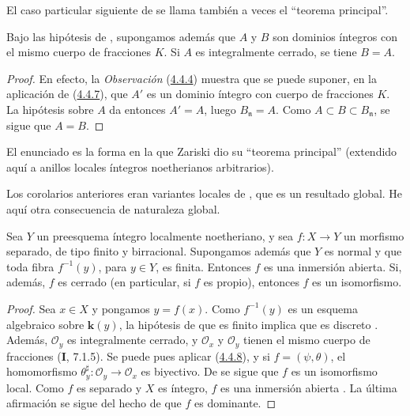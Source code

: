 El caso particular siguiente de  se llama también a
veces el ``teorema principal''.

\begin{corollary}[4.4.8]
\label{III.4.4.8}
\label{III.4.4.8-fr}
Bajo las hipótesis de , supongamos además que $A$ y
$B$ son dominios íntegros con el mismo cuerpo de fracciones $K$.
Si $A$ es
integralmente cerrado, se tiene $B=A$.
\end{corollary}

\begin{proof}
En efecto, la \emph{Observación} (\hyperref[III.4.4.4-fr]{4.4.4}) muestra que se puede
suponer, en la aplicación de (\hyperref[III.4.4.7-fr]{4.4.7}), que $A'$ es un dominio íntegro con
cuerpo de fracciones $K$. La hipótesis sobre $A$ da entonces
$A'=A$, luego $B_{\mathfrak n}=A$. Como
$A\subset B\subset B_{\mathfrak n}$, se sigue que $A=B$.
\end{proof}

El enunciado  es la forma en la que Zariski dio su
``teorema principal'' (extendido aquí a anillos locales íntegros
noetherianos arbitrarios).

Los corolarios anteriores eran variantes locales de
, que es un resultado global. He aquí otra
consecuencia de naturaleza global.

\begin{corollary}[4.4.9]
\label{III.4.4.9}
\label{III.4.4.9-fr}
Sea $Y$ un preesquema íntegro localmente noetheriano, y sea
$f:X\to Y$ un morfismo separado, de tipo finito y birracional.
Supongamos además que $Y$ es normal y que toda fibra $f^{-1}(y)$,
para $y\in Y$, es finita. Entonces $f$ es una inmersión abierta. Si,
además, $f$ es cerrado (en particular, si $f$ es propio), entonces
$f$ es un isomorfismo.
\end{corollary}

\begin{proof}
Sea $x\in X$ y pongamos $y=f(x)$. Como $f^{-1}(y)$ es un esquema
algebraico sobre $\boldsymbol{k}(y)$, la hipótesis de que es finito implica que
es discreto . Además, $\mathcal O_y$ es integralmente
cerrado, y $\mathcal O_x$ y $\mathcal O_y$ tienen el mismo cuerpo de fracciones (\textbf{I}, 7.1.5). Se puede pues aplicar (\hyperref[III.4.4.8-fr]{4.4.8}), y si $f=(\psi,\theta)$, el homomorfismo
$\theta_y^\sharp:\mathcal O_y\to\mathcal O_x$
es biyectivo. De  se sigue que $f$ es un isomorfismo
local. Como $f$ es separado y $X$ es íntegro, $f$ es una inmersión
abierta . La última afirmación se sigue del hecho de
que $f$ es dominante.
\end{proof}

